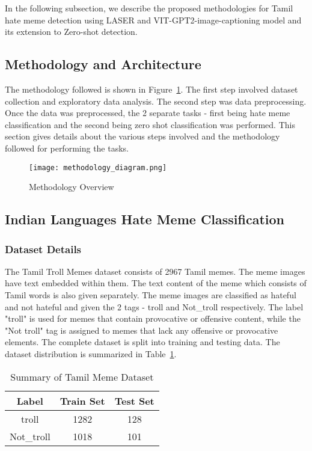 \documentclass{ieeeaccess}
\begin{document}
In the following subsection, we describe the proposed methodologies for Tamil hate meme detection using LASER and VIT-GPT2-image-captioning model and its extension to Zero-shot detection.

\subsection{Methodology and Architecture}

The methodology followed is shown in Figure~\ref{fig:methodology}. The first step involved dataset collection and exploratory data analysis. The second step was data preprocessing. Once the data was preprocessed, the 2 separate tasks - first being hate meme classification and the second being zero shot classification was performed. This section gives details about the various steps involved and the methodology followed for performing the tasks.

\begin{figure}[htbp]
\centering
\texttt{[image: methodology\_diagram.png]}
\caption{Methodology Overview}
\label{fig:methodology}
\end{figure}

\subsection{Indian Languages Hate Meme Classification}

\subsubsection{Dataset Details}
The Tamil Troll Memes dataset consists of 2967 Tamil memes. The meme images have text embedded within them. The text content of the meme which consists of Tamil words is also given separately. The meme images are classified as hateful and not hateful and given the 2 tags - troll and Not\_troll respectively. The label "troll" is used for memes that contain provocative or offensive content, while the "Not troll" tag is assigned to memes that lack any offensive or provocative elements. The complete dataset is split into training and testing data. The dataset distribution is summarized in Table~\ref{tab:tamil_dataset}.

\begin{table}[htbp]
\caption{Summary of Tamil Meme Dataset}
\label{tab:tamil_dataset}
\centering
\begin{tabular}{|c|c|c|}
\hline
\textbf{Label} & \textbf{Train Set} & \textbf{Test Set} \\
\hline
troll & 1282 & 128 \\
Not\_troll & 1018 & 101 \\
\hline
\end{tabular}
\end{table}
\end{document}
